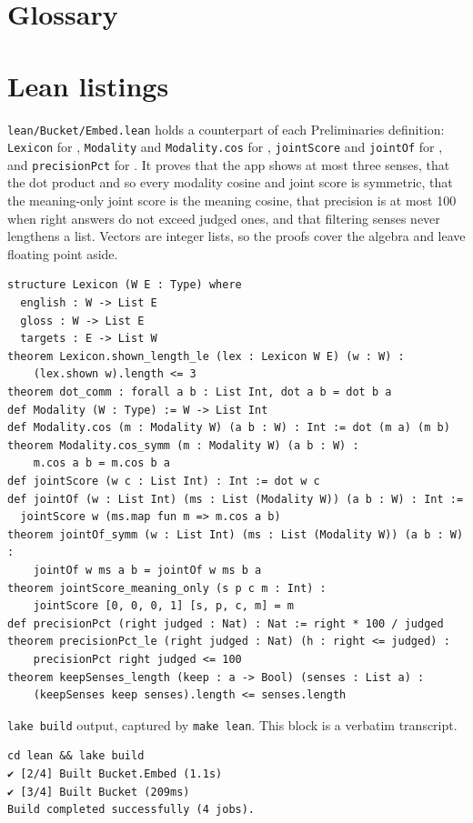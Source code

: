 \documentclass[11pt]{article}
\begin{document}
\printbibliography

\appendix

\section{Glossary}
\label{app:glossary}


\section{Lean listings}
\label{app:lean}

\texttt{lean/Bucket/Embed.lean} holds a counterpart of each Preliminaries definition: \texttt{Lexicon} for , \texttt{Modality} and \texttt{Modality.cos} for , \texttt{jointScore} and \texttt{jointOf} for , and \texttt{precisionPct} for . It proves that the app shows at most three senses, that the dot product and so every modality cosine and joint score is symmetric, that the meaning-only joint score is the meaning cosine, that precision is at most 100 when right answers do not exceed judged ones, and that filtering senses never lengthens a list. Vectors are integer lists, so the proofs cover the algebra and leave floating point aside.

\begin{lstlisting}[style=bucketlean]
structure Lexicon (W E : Type) where
  english : W -> List E
  gloss : W -> List E
  targets : E -> List W
theorem Lexicon.shown_length_le (lex : Lexicon W E) (w : W) :
    (lex.shown w).length <= 3
theorem dot_comm : forall a b : List Int, dot a b = dot b a
def Modality (W : Type) := W -> List Int
def Modality.cos (m : Modality W) (a b : W) : Int := dot (m a) (m b)
theorem Modality.cos_symm (m : Modality W) (a b : W) :
    m.cos a b = m.cos b a
def jointScore (w c : List Int) : Int := dot w c
def jointOf (w : List Int) (ms : List (Modality W)) (a b : W) : Int :=
  jointScore w (ms.map fun m => m.cos a b)
theorem jointOf_symm (w : List Int) (ms : List (Modality W)) (a b : W) :
    jointOf w ms a b = jointOf w ms b a
theorem jointScore_meaning_only (s p c m : Int) :
    jointScore [0, 0, 0, 1] [s, p, c, m] = m
def precisionPct (right judged : Nat) : Nat := right * 100 / judged
theorem precisionPct_le (right judged : Nat) (h : right <= judged) :
    precisionPct right judged <= 100
theorem keepSenses_length (keep : a -> Bool) (senses : List a) :
    (keepSenses keep senses).length <= senses.length
\end{lstlisting}

\texttt{lake build} output, captured by \texttt{make lean}. This block is a verbatim transcript.
\begin{verbatim}
cd lean && lake build
✔ [2/4] Built Bucket.Embed (1.1s)
✔ [3/4] Built Bucket (209ms)
Build completed successfully (4 jobs).
\end{verbatim}
\end{document}
